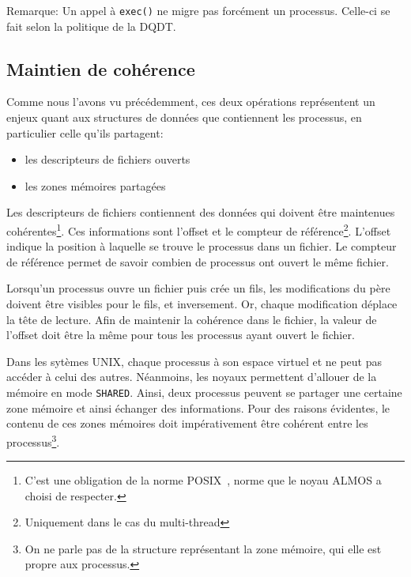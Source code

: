         \begin{paragraph}{Remarque:}
          Un appel à \texttt{exec()} ne migre pas forcément un
          processus. Celle-ci se fait selon la politique de la DQDT.
        \end{paragraph}


    \subsection{Maintien de cohérence}

      Comme nous l'avons vu précédemment, ces deux opérations représentent un
      enjeux quant aux structures de données que contiennent les processus, en
      particulier celle qu'ils partagent:
      \begin{itemize}
      \item les descripteurs de fichiers ouverts
      \item les zones mémoires partagées
      \end{itemize}

      Les descripteurs de fichiers contiennent des données qui doivent être
      maintenues cohérentes\footnote{C'est une obligation de la norme
        POSIX~\citep{posix2013}, norme que le noyau ALMOS a choisi de
        respecter.}. Ces informations sont l'offset et le compteur de
      référence\footnote{Uniquement dans le cas du multi-thread}. L'offset
      indique la position à laquelle se trouve le processus dans un fichier. Le
      compteur de référence permet de savoir combien de processus ont ouvert le
      même fichier.

      Lorsqu'un processus ouvre un fichier puis crée un fils, les modifications
      du père doivent être visibles pour le fils, et inversement. Or, chaque
      modification déplace la tête de lecture. Afin de maintenir la cohérence
      dans le fichier, la valeur de l'offset doit être la même pour tous les
      processus ayant ouvert le fichier.

      Dans les sytèmes UNIX, chaque processus à son espace virtuel et ne peut
      pas accéder à celui des autres. Néanmoins, les noyaux permettent d'allouer
      de la mémoire en mode \texttt{SHARED}. Ainsi, deux processus peuvent se
      partager une certaine zone mémoire et ainsi échanger des
      informations. Pour des raisons évidentes, le contenu de ces zones mémoires
      doit impérativement être cohérent entre les processus\footnote{On ne parle
        pas de la structure représentant la zone mémoire, qui elle est propre
        aux processus.}.

